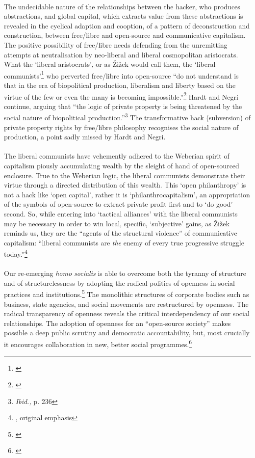 \paragraph{}The undecidable nature of the relationships between the hacker, who produces abstractions, and global capital, which extracts value from these abstractions is revealed in the cyclical adaption and cooption, of a pattern of deconstruction and construction, between free/libre and open-source and communicative capitalism. The positive possibility of free/libre needs defending from the unremitting attempts at neutralisation by neo-liberal and liberal cosmopolitan aristocrats. What the `liberal aristocrats', or as \v{Z}i\v{z}ek would call them, the `liberal communists'\footnote{\cite{Zizek:2006vile}} who perverted free/libre into open-source ``do not understand is that in the era of biopolitical production, liberalism and liberty based on the virtue of the few or even the many is becoming impossible.''\footnote{\cite[p. 236]{Hardt:2005zt}} Hardt and Negri continue, arguing that ``the logic of private property is being threatened by the social nature of biopolitical production.''\footnote{\textit{Ibid.,} p. 236} The transformative hack (subversion) of private property rights by free/libre philosophy recognises the social nature of production, a point sadly missed by Hardt and Negri.

\paragraph{}The liberal communists have vehemently adhered to the Weberian spirit of capitalism piously accumulating wealth by the sleight of hand of open-sourced enclosure. True to the Weberian logic, the liberal communists demonstrate their virtue through a directed distribution of this wealth. This `open philanthropy' is not a hack like `open capital', rather it is `philanthrocapitalism', an appropriation of the symbols of open-source to extract private profit first and to `do good' second. So, while entering into `tactical alliances' with the liberal communists may be necessary in order to win local, specific, `subjective' gains, as \v{Z}i\v{z}ek reminds us, they are the ``agents of the structural violence'' of communicative capitalism: ``liberal communists are \textit{the} enemy of every true progressive struggle today.''\footnote{\cite{Zizek:2006vile}, original emphasis}

\paragraph{}Our re-emerging \textit{homo socialis} is able to overcome both the tyranny of structure and of structurelessness by adopting the radical politics of openness in social practices and institutions.\footnote{\cite{Freeman:1970}} The monolithic structures of corporate bodies such as business, state agencies, and social movements are restructured by openness. The radical transparency of openness reveals the critical interdependency of our social relationships. The adoption of openness for an ``open-source society'' makes possible a deep public scrutiny and democratic accountability, but, most crucially it encourages collaboration in new, better social programmes.\footnote{\cite[pp. 339-40]{Hardt:2005zt}}
\skip
